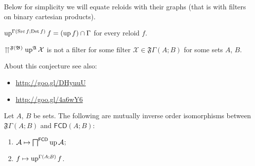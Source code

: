 Below for simplicity we will equate reloids with their graphs (that
is with filters on binary cartesian products).
\begin{obvious}
$\operatorname{up}^{\Gamma(\operatorname{Src} f;\operatorname{Dst} f)}f=(\operatorname{up} f)\cap\Gamma$ for every reloid
$f$.\end{obvious}
\begin{conjecture}
$\upuparrows^{\mathfrak{F}(\mathfrak{B})}\operatorname{up}^{\mathfrak{A}}\mathcal{X}$
is not a filter for some filter $\mathcal{X}\in\mathfrak{F}\Gamma(A;B)$
for some sets $A$, $B$.\end{conjecture}
\begin{rem}
About this conjecture see also: 
\begin{itemize}
\item \href{http://goo.gl/DHyuuU}{http://goo.gl/DHyuuU}
\item \href{http://goo.gl/4a6wY6}{http://goo.gl/4a6wY6}
\end{itemize}
\end{rem}
\begin{lem}
\label{faf-bij}Let $A$, $B$ be sets. The following are mutually
inverse order isomorphisms between $\mathfrak{F}\Gamma(A;B)$ and
$\mathsf{FCD}(A;B)$:
\begin{enumerate}
\item $\mathcal{A}\mapsto\bigsqcap^{\mathsf{FCD}}\operatorname{up}\mathcal{A}$;
\item $f\mapsto\operatorname{up}^{\Gamma(A;B)}f$.
\end{enumerate}
\end{lem}

